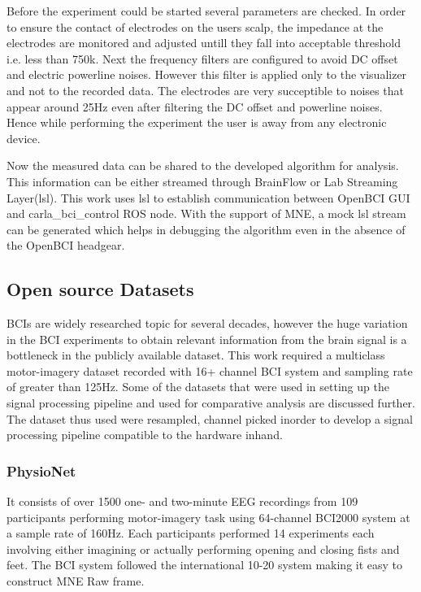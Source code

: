     Before the experiment could be started several parameters are checked. In order to ensure the contact of electrodes on the users scalp, the impedance at the electrodes are
monitored and adjusted untill they fall into acceptable threshold i.e. less than 750k\Omega. Next the frequency filters are configured to avoid DC offset and electric powerline 
noises. However this filter is applied only to the visualizer and not to the recorded data. The electrodes are very succeptible to noises that appear around 25Hz even after
filtering the DC offset and powerline noises. Hence while performing the experiment the user is away from any electronic device.

    Now the measured data can be shared to the developed algorithm for analysis. This information can be either streamed through BrainFlow or Lab Streaming Layer(lsl). This work
uses lsl to establish communication between OpenBCI GUI and carla_bci_control ROS node. With the support of MNE, a mock lsl stream can be generated which helps in debugging the
algorithm even in the absence of the OpenBCI headgear.

\subsection{Open source Datasets}
    BCIs are widely researched topic for several decades, however the huge variation in the BCI experiments to obtain relevant information from the brain signal is a bottleneck
in the publicly available dataset. This work required a multiclass motor-imagery dataset recorded with 16+ channel BCI system and sampling rate of greater than 125Hz. Some of the
datasets that were used in setting up the signal processing pipeline and used for comparative analysis are discussed further. The dataset thus used were resampled, channel picked
inorder to develop a signal processing pipeline compatible to the hardware inhand.

\subsubsection{PhysioNet}
    It consists of over 1500 one- and two-minute EEG recordings from 109 participants performing motor-imagery task using 64-channel BCI2000 system at a sample rate of 160Hz.
Each participants performed 14 experiments each involving either imagining or actually performing opening and closing fists and feet. The BCI system followed the international
10-20 system making it easy to construct MNE Raw frame.

